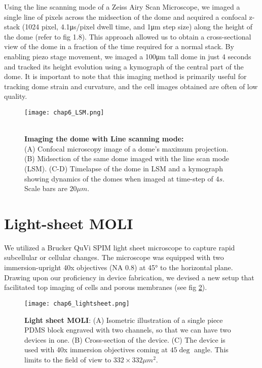Using the line scanning mode of a Zeiss Airy Scan Microscope, we imaged a single line of pixels across the midsection of the dome and acquired a confocal z-stack (1024 pixel, 4.1\unit{\us/pixel} dwell time, and 1\unit{\um} step size) along the height of the dome (refer to fig 1.8). This approach allowed us to obtain a cross-sectional view of the dome in a fraction of the time required for a normal stack. By enabling piezo stage movement, we imaged a 100\unit{\um} tall dome in just 4 seconds and tracked its height evolution using a kymograph of the central part of the dome. It is important to note that this imaging method is primarily useful for tracking dome strain and curvature, and the cell images obtained are often of low quality.


\begin{figure}[]
	\begin{minipage}[c]{0.6\textwidth}
		\texttt{[image: chap6\_LSM.png]}
	\end{minipage}\hfill
	\begin{minipage}[c]{0.35\textwidth}
		\caption{\\ \textbf{Imaging the dome with Line scanning mode:}\\ (A) Confocal microscopy image of a dome's maximum projection. (B) Midsection of the same dome imaged with the line scan mode (LSM). (C-D) Timelapse of the dome in LSM and a kymograph showing dynamics of the domes when imaged at time-step of $4s$. Scale bars are $20 \mu m$.
		} \label{fig_6_7}
	\end{minipage}
\end{figure}

\hypertarget{light-sheet-moli}{%
\section{Light-sheet MOLI}\label{light-sheet-moli}}

We utilized a Brucker QuVi SPIM light sheet microscope to capture rapid subcellular or cellular changes. The microscope was equipped with two immersion-upright 40x objectives (NA 0.8) at 45\unit{\degree} to the horizontal plane. Drawing upon our proficiency in device fabrication, we devised a new setup that facilitated top imaging of cells and porous membranes (see fig \ref{fig_6_8}).

\begin{figure}[]
	\centering
	\texttt{[image: chap6\_lightsheet.png]}
	\caption{ \textbf{Light sheet MOLI}: (A) Isometric illustration of a single piece PDMS block engraved with two channels, so that we can have two devices in one. (B) Cross-section of the device. (C) The device is used with 40x immersion objectives coming at $45 \deg$ angle. This limits to the field of view to $332\times 332\mu m^2$.
	}\label{fig_6_8}
\end{figure}

